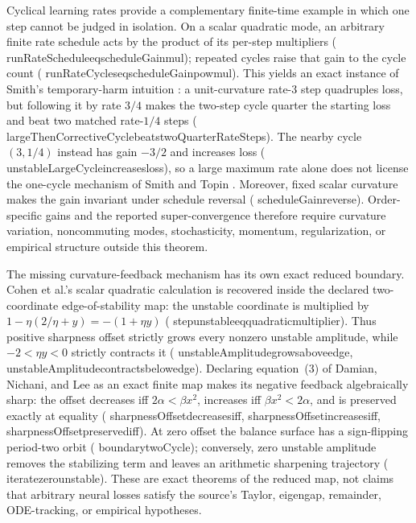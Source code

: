 \documentclass[11pt]{article}
\newcommand{\leanname}[1]{{\scriptsize\ttfamily
  \def\_{\textunderscore\allowbreak}#1}}
\begin{document}
Cyclical learning rates provide a complementary finite-time example in which
one step cannot be judged in isolation.  On a scalar quadratic mode, an
arbitrary finite rate schedule acts by the product of its per-step
multipliers
(\leanname{runRateSchedule\_eq\_scheduleGain\_mul}); repeated cycles raise that
gain to the cycle count
(\leanname{runRateCycles\_eq\_scheduleGain\_pow\_mul}).  This yields an exact
instance of Smith's temporary-harm intuition \cite{smith2017clr}: a
unit-curvature rate-$3$ step quadruples loss, but following it by rate $3/4$
makes the two-step cycle quarter the starting loss and beat two matched
rate-$1/4$ steps
(\leanname{largeThenCorrectiveCycle\_beats\_twoQuarterRateSteps}).
The nearby cycle $(3,1/4)$ instead has gain $-3/2$ and increases loss
(\leanname{unstableLargeCycle\_increases\_loss}), so a large maximum
rate alone does not license the one-cycle mechanism of Smith and Topin
\cite{smith2018super}.  Moreover, fixed scalar curvature makes the gain
invariant under schedule reversal (\leanname{scheduleGain\_reverse}).
Order-specific gains and the reported super-convergence therefore require
curvature variation, noncommuting modes, stochasticity, momentum,
regularization, or empirical structure outside this theorem.

The missing curvature-feedback mechanism has its own exact reduced boundary.
Cohen et al.'s scalar quadratic calculation \cite{cohen2021edge} is recovered
inside the declared two-coordinate edge-of-stability map: the unstable
coordinate is multiplied by
$1-\eta(2/\eta+y)=-(1+\eta y)$
(\leanname{step\_unstable\_eq\_quadratic\_multiplier}).  Thus positive
sharpness offset strictly grows every nonzero unstable amplitude, while
$-2<\eta y<0$ strictly contracts it
(\leanname{unstableAmplitude\_grows\_above\_edge},
\leanname{unstableAmplitude\_contracts\_below\_edge}).
Declaring equation~(3) of Damian, Nichani, and Lee
\cite{damian2022self} as an exact finite map makes its negative feedback
algebraically sharp: the offset decreases iff
$2\alpha<\beta x^2$, increases iff $\beta x^2<2\alpha$, and is preserved
exactly at equality
(\leanname{sharpnessOffset\_decreases\_iff},
\leanname{sharpnessOffset\_increases\_iff},
\leanname{sharpnessOffset\_preserved\_iff}).  At zero offset the balance
surface has a sign-flipping period-two orbit
(\leanname{boundary\_twoCycle}); conversely, zero unstable amplitude removes
the stabilizing term and leaves an arithmetic sharpening trajectory
(\leanname{iterate\_zero\_unstable}).  These are exact theorems of the reduced
map, not claims that arbitrary neural losses satisfy the source's Taylor,
eigengap, remainder, ODE-tracking, or empirical hypotheses.
\end{document}
